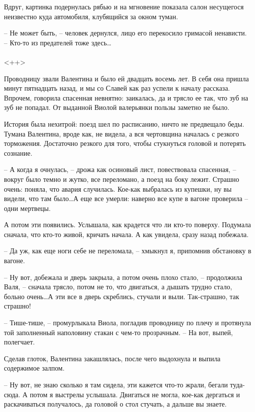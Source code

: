\documentclass[a4paper]{book}
\begin{document}
Вдруг, картинка подернулась рябью и на мгновение показала салон несущегося неизвестно куда автомобиля, клубящийся за окном туман.

-- Не может быть, -- человек дернулся, лицо его перекосило гримасой ненависти. -- Кто-то из предателей тоже здесь\ldots

\paragraph{}<++>

Проводницу звали Валентина и было ей двадцать восемь лет. В себя она пришла минут пятнадцать назад, и мы со Славей как раз успели к началу рассказа. Впрочем, говорила спасенная невнятно: заикалась, да и трясло ее так, что зуб на зуб не попадал. От выданной Виолой валерьянки пользы заметно не было.

История была нехитрой: поезд шел по расписанию, ничто не предвещало беды. Тумана Валентина, вроде как, не видела, а вся чертовщина началась с резкого торможения. Достаточно резкого для того, чтобы стукнуться головой и потерять сознание. 

-- А когда я очнулась, -- дрожа как осиновый лист, повествовала спасенная, -- вокруг было темно и жутко, все переломано, а поезд на боку лежит. Страшно очень: поняла, что авария случилась. Кое-как выбралась из купешки, ну вы видели, что там было\ldots А еще все умерли: наверно все купе в вагоне проверила -- одни мертвецы.

А потом эти появились. Услышала, как крадется что ли кто-то поверху. Подумала сначала, что кто-то живой, кричать начала. А как увидела, сразу назад побежала. 

-- Да уж, как еще ноги себе не переломала, -- хмыкнул я, припомнив обстановку в вагоне. 

-- Ну вот, добежала и дверь закрыла, а потом очень плохо стало, -- продолжила Валя, -- сначала трясло, потом не то, что двигаться, а дышать трудно стало, больно очень\ldots А эти все в дверь скреблись, стучали и выли. Так-страшно, так страшно! 

-- Тише-тише, -- промурлыкала Виола, погладив проводницу по плечу и протянула той заполненный наполовину стакан с чем-то прозрачным. -- На вот, выпей, полегчает. 

Сделав глоток, Валентина закашлялась, после чего выдохнула и выпила содержимое залпом.

-- Ну вот, не знаю сколько я там сидела, эти кажется что-то жрали, бегали туда-сюда. А потом я выстрелы услышала. Двигаться не могла, кое-как дергаться и раскачиваться получалось, да головой о стол стучать, а дальше вы знаете. 
\end{document}

